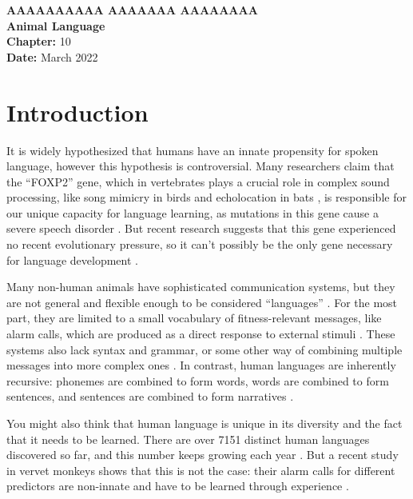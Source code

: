 \documentclass[a4paper,11pt]{article}
\begin{document}
  \begin{singlespace}
    \large
    {\bf AAAAAAAAAA AAAAAAA AAAAAAAA} \\[12pt]
    {\huge\bf Animal Language} \\[6pt]
    \textbf{Chapter:} 10 \\
    \textbf{Date:} March 2022
  \end{singlespace}
  \vspace{-\parskip}

  \section{Introduction}
  It is widely hypothesized that humans have an innate propensity for spoken language,
  however this hypothesis is controversial.
  Many researchers claim that the ``FOXP2'' gene,
  which in vertebrates plays a crucial role in complex sound processing,
  like song mimicry in birds and echolocation in bats \cite{campbell2009conservation},
  is responsible for our unique capacity for language learning,
  as mutations in this gene cause a severe speech disorder \cite{thebook2}.
  But recent research suggests that this gene experienced no recent evolutionary pressure,
  so it can't possibly be the only gene necessary for language development \cite{atkinson2018no}.

  Many non-human animals have sophisticated communication systems,
  but they are not general and flexible enough to be considered ``languages'' \cite{thebook2}.
  For the most part, they are limited to a small vocabulary of fitness-relevant messages,
  like alarm calls, which are produced as a direct response to external stimuli \cite{fitch2020animalcognition}.
  These systems also lack syntax and grammar,
  or some other way of combining multiple messages into more complex ones \cite{thebook2}.
  In contrast, human languages are inherently recursive:
  phonemes are combined to form words, words are combined to form sentences,
  and sentences are combined to form narratives \cite{bowling2015animal}.

  You might also think that human language is unique in its diversity and the fact that it needs to be learned.
  There are over 7151 distinct human languages discovered so far, and this number keeps growing each year \cite{ethnologue}.
  But a recent study in vervet monkeys shows that this is not the case:
  their alarm calls for different predictors are non-innate and have to be learned through experience \cite{liska1993bee}.
\end{document}
